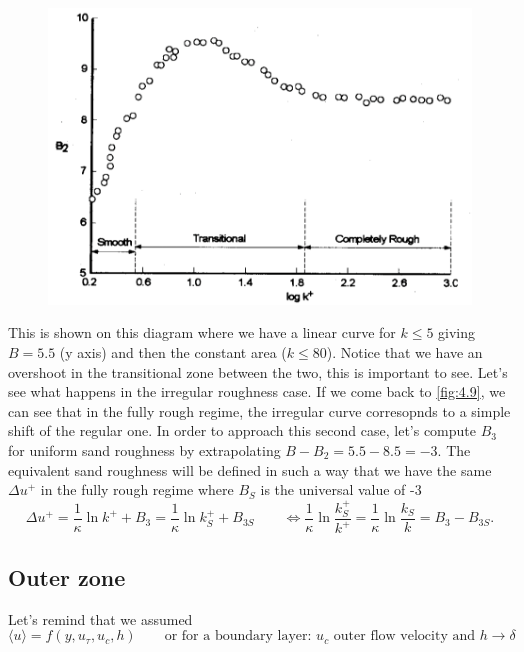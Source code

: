 		\begin{figure}
		\vspace{-2mm}
		\includegraphics[scale=0.35]{ch4/10}
		\end{figure} 
		This is shown on this diagram where we have a linear curve for $k\leq 5$ giving $B = 5.5$ (y axis) and then the constant area ($k\leq 80$). Notice that we have an overshoot in the transitional zone between the two, this is important to see. Let's see what happens in the irregular roughness case. If we come back to \autoref{fig:4.9}, we can see that in the fully rough regime, the irregular curve corresopnds to a simple shift of the regular one. In order to approach this second case, let's compute $B_3$ for uniform sand roughness by extrapolating $B - B_2 = 5.5 - 8.5 = -3$. The equivalent sand roughness will be defined in such a way that we have the same $\Delta u^+$ in the fully rough regime where $B_S$ is the universal value of -3 
		\begin{equation}
			\Delta u^+ = \frac{1}{\kappa} \ln k^+ + B_3 = \frac{1}{\kappa} \ln k_S^+ + B_{3S} \qquad \Leftrightarrow \frac{1}{\kappa} \ln \frac{k_S^+}{k^+} = \frac{1}{\kappa} \ln \frac{k_S}{k} = B_3-B_{3S}.
		\end{equation}
		
	
	\subsection{Outer zone}
		Let's remind that we assumed 
		\begin{equation}
			\langle u \rangle = f(y,u_\tau , u_c , h) \qquad \mbox{or for a boundary layer: } u_c \mbox{ outer flow velocity and } h\rightarrow \delta 
			\label{eq:4.46}
		\end{equation}

